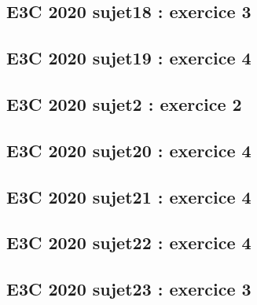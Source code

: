 \documentclass[lang=fr,edition=teacher,layout=sheet]{mxbook}
\begin{document}
\begingroup\endgroup
\par\bigskip
{}\subsection*{E3C 2020 sujet18 : exercice 3}
\begingroup\endgroup
\par\bigskip
{}\subsection*{E3C 2020 sujet19 : exercice 4}
\begingroup\endgroup
\par\bigskip
{}\subsection*{E3C 2020 sujet2 : exercice 2}
\begingroup\endgroup
\par\bigskip
{}\subsection*{E3C 2020 sujet20 : exercice 4}
\begingroup\endgroup
\par\bigskip
{}\subsection*{E3C 2020 sujet21 : exercice 4}
\begingroup\endgroup
\par\bigskip
{}\subsection*{E3C 2020 sujet22 : exercice 4}
\begingroup\endgroup
\par\bigskip
{}\subsection*{E3C 2020 sujet23 : exercice 3}
\begingroup\endgroup
\end{document}
